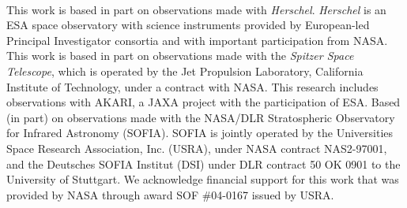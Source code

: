 \documentclass{emulateapj}
\begin{document}
\

\acknowledgments

This work is based in part on observations made with \textit{Herschel}. \textit{Herschel} is an ESA space observatory with science instruments provided by European-led Principal Investigator consortia and with important participation from NASA.
This work is based in part on observations made with the \textit{Spitzer Space Telescope}, which is operated by the Jet Propulsion Laboratory, California Institute of Technology, under a contract with NASA.
This research includes observations with AKARI, a JAXA project with the participation of ESA.
Based (in part) on observations made with the NASA/DLR Stratospheric Observatory for Infrared Astronomy (SOFIA). SOFIA is jointly operated by the Universities Space Research Association, Inc. (USRA), under NASA contract NAS2-97001, and the Deutsches SOFIA Institut (DSI) under DLR contract 50 OK 0901 to the University of Stuttgart. We acknowledge financial support for this work that was provided by NASA through award SOF \#04-0167 issued by USRA.


\end{document}
